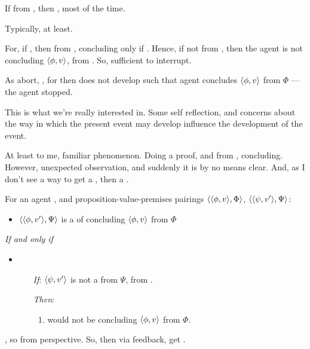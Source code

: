 \begin{note}
  \begin{idea}[Feedback]
    If \curb{} from \agpe{}, then \curb{}, most of the time.
    \begin{argument}
      Typically, at least.

      For, if \requ{}, then from \agpe{}, concluding only if \fc{}.
      Hence, if not \fc{} from \agpe{}, then the agent is not concluding \(\langle \phi, v \rangle\), from .
      So, sufficient to interrupt.

      As abort, \curb{}, for then does not develop such that agent concludes \(\langle \phi, v \rangle\) from \(\Phi\) --- the agent stopped.
    \end{argument}
  \end{idea}

  This is what we're really interested in.
  Some self reflection, and concerns about the way in which the present event may develop influence the development of the event.

  At least to me, familiar phenomenon.
  Doing a proof, and from , concluding.
  However, unexpected observation, and suddenly it is by no means clear.
  And, as I don't see a way to get a \fc{}, then a \curb{}.
\end{note}

\begin{note}
  \begin{proposition}
    For an agent \vAgent{}, and proposition-value-premises pairings \(\langle \langle \phi, v \rangle, \Phi \rangle\), \(\langle \langle \psi, v' \rangle, \Psi \rangle\):

    \begin{itemize}
    \item
      \(\langle \langle \phi, v' \rangle, \Psi \rangle\) is a \requ{} of \vAgent{} concluding \(\langle \phi, v \rangle\) from \(\Phi\)
    \end{itemize}

    \emph{If and only if}

    \begin{itemize}
    \item
        \begin{enumerate}
        \item[\emph{If}:]
          \(\langle \psi, v' \rangle\) is not a \fc{} from \(\Psi\), from .
        \item[\emph{Then}:]
          \begin{enumerate}[label=\alph*., ref=(\alph*), resume]
          \item
            \label{def:curb:fail}
            \vAgent{} would not be concluding \(\langle \phi, v \rangle\) from \(\Phi\).
          \end{enumerate}
      \end{enumerate}
    \end{itemize}
    \begin{argument}
      \requ{}, so \curb{} from perspective.
      So, then via feedback, get \curb{}.
    \end{argument}
  \end{proposition}
\end{note}

